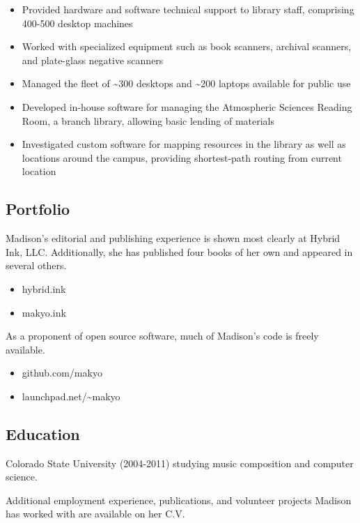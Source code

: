 \documentclass[letterpaper]{memoir}
\begin{document}
\begin{description}
    \begin{itemize}
        \tightlist
        \item
        Provided hardware and software technical support to library staff, comprising 400-500 desktop machines
        \item
        Worked with specialized equipment such as book scanners, archival scanners, and plate-glass negative scanners
        \item
        Managed the fleet of \textasciitilde{}300 desktops and \textasciitilde{}200 laptops available for public use
        \item
        Developed in-house software for managing the Atmospheric Sciences Reading Room, a branch library, allowing basic lending of materials
        \item
        Investigated custom software for mapping resources in the library as well as locations around the campus, providing shortest-path routing from current location
    \end{itemize}
\end{description}

\subsection{Portfolio}

\begin{description}
  \tightlist
  \item[Writing] Madison's editorial and publishing experience is shown most clearly at Hybrid Ink, LLC. Additionally, she has published four books of her own and appeared in several others.

  \begin{itemize}
    \tightlist
    \item hybrid.ink
    \item makyo.ink
  \end{itemize}
  \item[Tech] As a proponent of open source software, much of Madison's code is freely available.

  \begin{itemize}
    \tightlist
    \item github.com/makyo
    \item launchpad.net/\textasciitilde{}makyo
  \end{itemize}
\end{description}

\subsection{Education}\label{education}

\begin{description}
\tightlist
\item[University] \hfill
Colorado State University (2004-2011) studying music composition and
computer science.
\end{description}

Additional employment experience, publications, and volunteer projects
Madison has worked with are available on her C.V.
\end{document}
